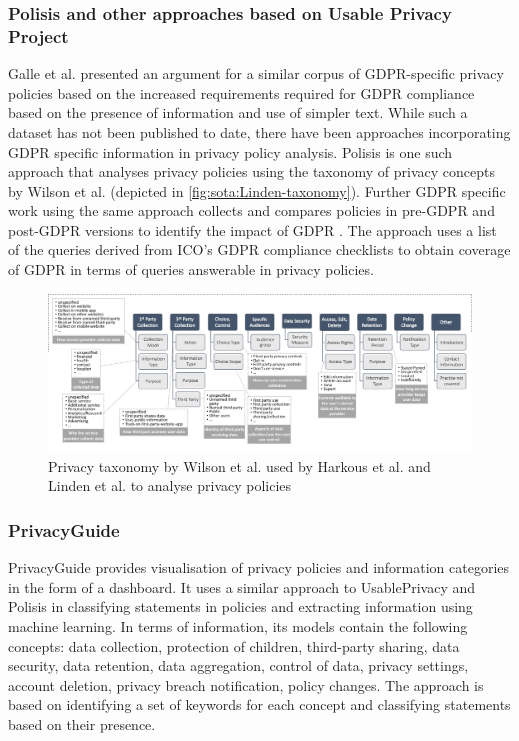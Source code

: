 \subsubsection{Polisis and other approaches based on Usable Privacy Project}
Galle et al. \cite{galle_case_2019} presented an argument for a similar corpus of GDPR-specific privacy policies based on the increased requirements required for GDPR compliance based on the presence of information and use of simpler text. While such a dataset has not been published to date, there have been approaches incorporating GDPR specific information in privacy policy analysis.
Polisis \cite{harkous_polisis:_2018} is one such approach that analyses privacy policies using the taxonomy of privacy concepts by Wilson et al. \cite{wilson_creation_2016} (depicted in \autoref{fig:sota:Linden-taxonomy}).
Further GDPR specific work using the same approach collects and compares policies in pre-GDPR and post-GDPR versions to identify the impact of GDPR \cite{linden_privacy_2018}. The approach uses a list of the queries derived from ICO’s GDPR compliance checklists to obtain coverage of GDPR in terms of queries answerable in privacy policies.
\begin{figure}[htbp]
    \centering
    \includegraphics[width=\linewidth]{img/Linden_taxonomy.png}
    \caption{Privacy taxonomy by Wilson et al. \cite{wilson_creation_2016} used by Harkous et al. \cite{harkous_polisis:_2018} and Linden et al.  \cite{linden_privacy_2018} to analyse privacy policies}
    \label{fig:sota:Linden-taxonomy}
\end{figure}

\subsubsection{PrivacyGuide}
PrivacyGuide \cite{tesfay_privacyguide:_2018} provides visualisation of privacy policies and information categories in the form of a dashboard. It uses a similar approach to UsablePrivacy and Polisis in classifying statements in policies and extracting information using machine learning. In terms of information, its models contain the following concepts: data collection, protection of children, third-party sharing, data security, data retention, data aggregation, control of data, privacy settings, account deletion, privacy breach notification, policy changes.
The approach is based on identifying a set of keywords for each concept and classifying statements based on their presence.

